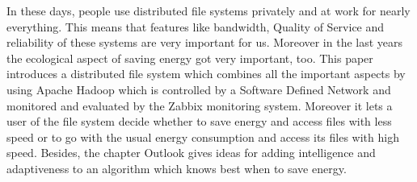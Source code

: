 



In these days, people use distributed file systems privately and at work for nearly everything. This means that features like bandwidth, Quality of Service and reliability of these systems are very important for us. Moreover in the last years the ecological aspect of saving energy got very important, too. This paper introduces a distributed file system which combines all the important aspects by using Apache Hadoop\textsuperscript{\textregistered} which is controlled by a Software Defined Network and monitored and evaluated by the Zabbix monitoring system. Moreover it lets a user of the file system decide whether to save energy and access files with less speed or to go with the usual energy consumption and access its files with high speed. Besides, the chapter Outlook gives ideas for adding intelligence and adaptiveness to an algorithm which knows best when to save energy.